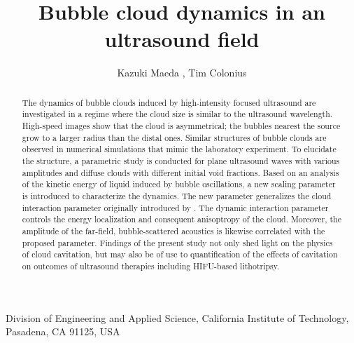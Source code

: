 \documentclass{jfm}
\begin{document}
\newtheorem{lemma}{Lemma}
\newtheorem{corollary}{Corollary}


\title{Bubble cloud dynamics in an ultrasound field}

\author
 {
 Kazuki Maeda
  ,
  Tim Colonius%
  }

\affiliation
{
Division of Engineering and Applied Science, California Institute of Technology, Pasadena, CA 91125, USA
}
\maketitle

\begin{abstract}
The dynamics of bubble clouds induced by high-intensity focused ultrasound are investigated in a regime where the cloud size is similar to the ultrasound wavelength.
High-speed images show that the cloud is asymmetrical; the bubbles nearest the source grow to a larger radius than the distal ones.
Similar structures of bubble clouds are observed in numerical simulations that mimic the laboratory experiment.
To elucidate the structure, a parametric study is conducted for plane ultrasound waves with various amplitudes and diffuse clouds with different initial void fractions.
Based on an analysis of the kinetic energy of liquid induced by bubble oscillations, a new scaling parameter is introduced to characterize the dynamics. The new parameter generalizes the cloud interaction parameter originally introduced by \citet{dAgostino89}.
The dynamic interaction parameter controls the energy localization and consequent anisoptropy of the cloud.
Moreover, the amplitude of the far-field, bubble-scattered acoustics is likewise correlated with the proposed parameter. Findings of the present study not only shed light on the physics of cloud cavitation, but may also be of use to quantification of the effects of cavitation on outcomes of ultrasound therapies including HIFU-based lithotripsy.
\end{abstract}
\end{document}
